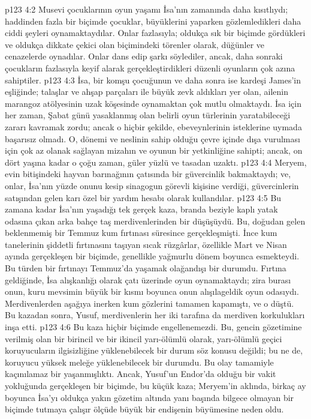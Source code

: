 \vs p123 4:2 Musevi çocuklarının oyun yaşamı İsa’nın zamanında daha kısıtlıydı; haddinden fazla bir biçimde çocuklar, büyüklerini yaparken gözlemledikleri daha ciddi şeyleri oynamaktaydılar. Onlar fazlasıyla; oldukça sık bir biçimde gördükleri ve oldukça dikkate çekici olan biçimindeki törenler olarak, düğünler ve cenazelerde oynadılar. Onlar dans edip şarkı söylediler, ancak, daha sonraki çocukların fazlasıyla keyif alarak gerçekleştirdikleri düzenli oyunların çok azına sahiptiler.
\vs p123 4:3 İsa, bir komşu çocuğunun ve daha sonra ise kardeşi James’in eşliğinde; talaşlar ve ahşap parçaları ile büyük zevk aldıkları yer olan, ailenin marangoz atölyesinin uzak köşesinde oynamaktan çok mutlu olmaktaydı. İsa için her zaman, Şabat günü yasaklanmış olan belirli oyun türlerinin yaratabileceği zararı kavramak zordu; ancak o hiçbir şekilde, ebeveynlerinin isteklerine uymada başarısız olmadı. O, dönemi ve neslinin sahip olduğu çevre içinde dışa vurulması için çok az olanak sağlayan mizahın ve oyunun bir yetkinliğine sahipti; ancak, on dört yaşına kadar o çoğu zaman, güler yüzlü ve tasadan uzaktı.
\vs p123 4:4 Meryem, evin bitişindeki hayvan barınağının çatısında bir güvercinlik bakmaktaydı; ve, onlar, İsa’nın yüzde onunu kesip sinagogun görevli kişisine verdiği, güvercinlerin satışından gelen karı özel bir yardım hesabı olarak kullandılar.
\vs p123 4:5 Bu zamana kadar İsa’nın yaşadığı tek gerçek kaza, branda beziyle kaplı yatak odasına çıkan arka bahçe taş merdivenlerinden bir düşüşüydü. Bu, doğudan gelen beklenmemiş bir Temmuz kum fırtınası süresince gerçekleşmişti. İnce kum tanelerinin şiddetli fırtınasını taşıyan sıcak rüzgârlar, özellikle Mart ve Nisan ayında gerçekleşen bir biçimde, genellikle yağmurlu dönem boyunca esmekteydi. Bu türden bir fırtınayı Temmuz’da yaşamak olağandışı bir durumdu. Fırtına geldiğinde, İsa alışkanlığı olarak çatı üzerinde oyun oynamaktaydı; zira burası onun, kuru mevsimin büyük bir kısmı boyunca onun alışılageldik oyun odasıydı. Merdivenlerden aşağıya inerken kum gözlerini tamamen kapamıştı, ve o düştü. Bu kazadan sonra, Yusuf, merdivenlerin her iki tarafına da merdiven korkulukları inşa etti.
\vs p123 4:6 Bu kaza hiçbir biçimde engellenemezdi. Bu, gencin gözetimine verilmiş olan bir birincil ve bir ikincil yarı\hyp{}ölümlü olarak, yarı\hyp{}ölümlü geçici koruyucuların ilgisizliğine yüklenebilecek bir durum söz konusu değildi; bu ne de, koruyucu yüksek meleğe yüklenebilecek bir durumdu. Bu olay tamamiyle kaçınılamaz bir yaşanmışlıktı. Ancak, Yusuf’un Endor’da olduğu bir vakit yokluğunda gerçekleşen bir biçimde, bu küçük kaza; Meryem’in aklında, birkaç ay boyunca İsa’yı oldukça yakın gözetim altında yanı başında bilgece olmayan bir biçimde tutmaya çalışır ölçüde büyük bir endişenin büyümesine neden oldu.
